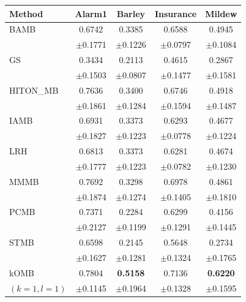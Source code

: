 \setlength{\tabcolsep}{5pt}
\begin{tabular}{lcccc}
\toprule
Method & Alarm1 & Barley & Insurance & Mildew \\
\midrule

BAMB
& 0.6742 & 0.3385 & 0.6588 & 0.4945 \\
& {\scriptsize $\pm$0.1771} & {\scriptsize $\pm$0.1226} & {\scriptsize $\pm$0.0797} & {\scriptsize $\pm$0.1084} \\

GS
& 0.3434 & 0.2113 & 0.4615 & 0.2867 \\
& {\scriptsize $\pm$0.1503} & {\scriptsize $\pm$0.0807} & {\scriptsize $\pm$0.1477} & {\scriptsize $\pm$0.1581} \\

HITON\_MB
& 0.7636 & 0.3400 & 0.6746 & 0.4918 \\
& {\scriptsize $\pm$0.1861} & {\scriptsize $\pm$0.1284} & {\scriptsize $\pm$0.1594} & {\scriptsize $\pm$0.1487} \\

IAMB
& 0.6931 & 0.3373 & 0.6293 & 0.4677 \\
& {\scriptsize $\pm$0.1827} & {\scriptsize $\pm$0.1223} & {\scriptsize $\pm$0.0778} & {\scriptsize $\pm$0.1224} \\

LRH
& 0.6813 & 0.3373 & 0.6281 & 0.4674 \\
& {\scriptsize $\pm$0.1777} & {\scriptsize $\pm$0.1223} & {\scriptsize $\pm$0.0782} & {\scriptsize $\pm$0.1230} \\

MMMB
& 0.7692 & 0.3298 & 0.6978 & 0.4861 \\
& {\scriptsize $\pm$0.1874} & {\scriptsize $\pm$0.1274} & {\scriptsize $\pm$0.1405} & {\scriptsize $\pm$0.1810} \\

PCMB
& 0.7371 & 0.2284 & 0.6299 & 0.4156 \\
& {\scriptsize $\pm$0.2127} & {\scriptsize $\pm$0.1199} & {\scriptsize $\pm$0.1291} & {\scriptsize $\pm$0.1445} \\

STMB
& 0.6598 & 0.2145 & 0.5648 & 0.2734 \\
& {\scriptsize $\pm$0.1627} & {\scriptsize $\pm$0.1281} & {\scriptsize $\pm$0.1324} & {\scriptsize $\pm$0.1765} \\

kOMB
& 0.7804 & \textbf{0.5158} & 0.7136 & \textbf{0.6220} \\
{\scriptsize $(k=1,l=1)$} & {\scriptsize $\pm$0.1145} & {\scriptsize $\pm$0.1964} & {\scriptsize $\pm$0.1328} & {\scriptsize $\pm$0.1595} \\


\end{tabular}
